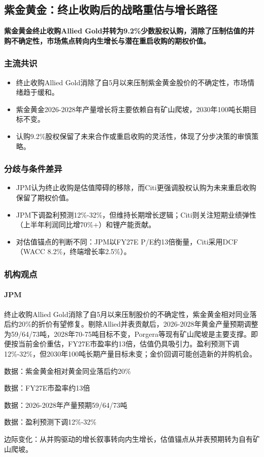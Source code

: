\documentclass[11pt]{ctexart}
\begin{document}
\subsection{紫金黄金：终止收购后的战略重估与增长路径}
\textbf{紫金黄金终止收购Allied Gold并转为9.2\%少数股权认购，消除了压制估值的并购不确定性，市场焦点转向内生增长与潜在重启收购的期权价值。}
\subsubsection*{主流共识}
\begin{itemize}
  \item 终止收购Allied Gold消除了自5月以来压制紫金黄金股价的不确定性，市场情绪趋于缓和。
  \item 紫金黄金2026-2028年产量增长将主要依赖自有矿山爬坡，2030年100吨长期目标不变。
  \item 认购9.2\%股权保留了未来合作或重启收购的灵活性，体现了分步决策的审慎策略。
\end{itemize}
\subsubsection*{分歧与条件差异}
\begin{itemize}
  \item JPM认为终止收购是估值障碍的移除，而Citi更强调股权认购为未来重启收购保留了期权价值。
  \item JPM下调盈利预测12\%-32\%，但维持长期增长逻辑；Citi则关注短期业绩弹性（上半年利润同比增70\%+）和锂产能贡献。
  \item 对估值锚点的判断不同：JPM以FY27E P/E约13倍衡量，Citi采用DCF（WACC 8.2\%，终端增长率2.5\%）。
\end{itemize}
\subsubsection*{机构观点}
\paragraph{JPM} 终止收购Allied Gold消除了自5月以来压制股价的不确定性，紫金黄金相对同业落后约20\%的折价有望修复。剔除Allied并表贡献后，2026-2028年黄金产量预期调整为59/64/73吨，2028年70-75吨目标不变，Porgera等现有矿山爬坡是主要支撑。即便按当前金价重估，FY27E市盈率约13倍，估值仍具吸引力。盈利预测下调12\%-32\%，但2030年100吨长期产量目标未变；金价回调可能创造新的并购机会。
{\small\color{refgray}数据：紫金黄金相对黄金同业落后约20\%\par}
{\small\color{refgray}数据：FY27E市盈率约13倍\par}
{\small\color{refgray}数据：2026-2028年产量预期59/64/73吨\par}
{\small\color{refgray}数据：盈利预测下调12\%-32\%\par}
{\small\color{refgray}边际变化：从并购驱动的增长叙事转向内生增长，估值锚点从并表预期转为自有矿山爬坡。\par}
\end{document}
